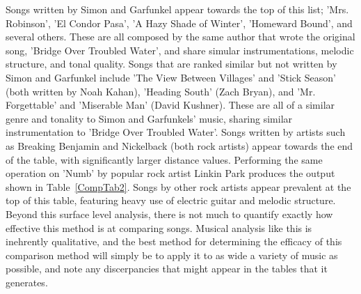 \documentclass[conference]{IEEEtran}
\begin{document}
Songs written by Simon and Garfunkel appear towards the top of this list; 'Mrs. Robinson', 'El Condor Pasa', 'A Hazy Shade of Winter', 'Homeward Bound', and several others. These are all composed by the same author that wrote the original song, 'Bridge Over Troubled Water', and share simular instrumentations, melodic structure, and tonal quality. Songs that are ranked similar but not written by Simon and Garfunkel include 'The View Between Villages' and 'Stick Season' (both written by Noah Kahan), 'Heading South' (Zach Bryan), and 'Mr. Forgettable' and 'Miserable Man' (David Kushner). These are all of a similar genre and tonality to Simon and Garfunkels' music, sharing similar instrumentation to 'Bridge Over Troubled Water'. Songs written by artists such as Breaking Benjamin and Nickelback (both rock artists) appear towards the end of the table, with significantly larger distance values. Performing the same operation on 'Numb' by popular rock artist Linkin Park produces the output shown in Table~\ref{CompTab2}. Songs by other rock artists appear prevalent at the top of this table, featuring heavy use of electric guitar and melodic structure. Beyond this surface level analysis, there is not much to quantify exactly how effective this method is at comparing songs. Musical analysis like this is inehrently qualitative, and the best method for determining the efficacy of this comparison method will simply be to apply it to as wide a variety of music as possible, and note any discerpancies that might appear in the tables that it generates. 
\end{document}
